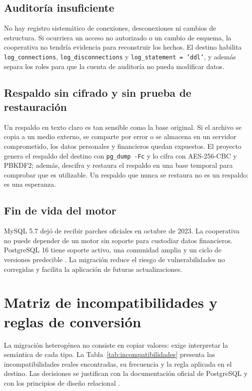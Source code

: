 \subsection{Auditoría insuficiente}

No hay registro sistemático de conexiones, desconexiones ni cambios de
estructura. Si ocurriera un acceso no autorizado o un cambio de esquema, la
cooperativa no tendría evidencia para reconstruir los hechos. El destino
habilita \texttt{log\_connections}, \texttt{log\_disconnections} y
\texttt{log\_statement = 'ddl'}, y además separa los roles para que la cuenta
de auditoría no pueda modificar datos.

\subsection{Respaldo sin cifrado y sin prueba de restauración}

Un respaldo en texto claro es tan sensible como la base original. Si el
archivo se copia a un medio externo, se comparte por error o se almacena en
un servidor comprometido, los datos personales y financieros quedan
expuestos. El proyecto genera el respaldo del destino con
\texttt{pg\_dump -Fc} y lo cifra con AES-256-CBC y PBKDF2; además, descifra y
restaura el respaldo en una base temporal para comprobar que es utilizable.
Un respaldo que nunca se restaura no es un respaldo: es una esperanza.

\subsection{Fin de vida del motor}

MySQL 5.7 dejó de recibir parches oficiales en octubre de 2023. La
cooperativa no puede depender de un motor sin soporte para custodiar datos
financieros. PostgreSQL 16 tiene soporte activo, una comunidad amplia y un
ciclo de versiones predecible \citep{postgresql2024}. La migración reduce el
riesgo de vulnerabilidades no corregidas y facilita la aplicación de futuras
actualizaciones.

\section{Matriz de incompatibilidades y reglas de conversión}

La migración heterogénea no consiste en copiar valores: exige interpretar la
semántica de cada tipo. La Tabla~\ref{tab:incompatibilidades} presenta las
incompatibilidades reales encontradas, su frecuencia y la regla aplicada en el
destino. Las decisiones se justifican con la documentación oficial de
PostgreSQL \citep{postgresql2024} y con los principios de diseño relacional
\citep{elmasri2016,silberschatz2020}.


